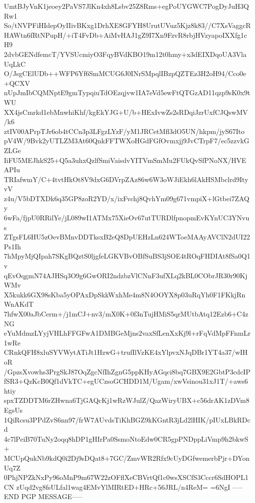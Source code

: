UmtBJyVnK1jeoey2PaVS7JlKn4xh8Lsbv25Z8Rms+egPoUYGWC7PogDyJuH3QRw1
So/tNVPFiHIdepOyIIivBKxg1DrhXE8GFYH8UrutUVuz5Kjz8k83//C7XsVaggcR
HAWtn6fRtNPupH/+iT4FvDb+AiMvHAJ1gZ9I7Xn9FzvR8rbjHVzyapoIXXfg1cH9
2dvbGENdfemcT/YVSUcmiyO3FqyBVdKBO19m12t0hmy+x3dEIXDqoUA3VlaUqLkC
O/JsgCElUDb++WFP6Yf6SmMCUG6J0INrSMpqlIBzpQZTEz3H2oH94/Cco0e+QCXV
nUpJmIbCQMNptE9gmTypqiuTdOEzqjvw1IA7eVd5ewFtQTGzAD11qzp9sK0x9tWU
XX4jsCmrkd1ebMnwhiKhf/kgEkYJG+U/b+HExIvwZs2sRDqiJzrUxfCJQswMV/k6
ztIV00APrpTJr6ob4tCCn3p3LFgzLYzF/yM1JRCetMfl3dO5UN/hkpm/jyS67Ito
pV4W/9Bvk2yUTLZM3At60QnkFFTWXoHGdFGfOvmxjj9JvCTrpF7/ec5zzvkGZLGe
IiFU5MEJhkS25+Q5a3uhxQzlfSmiVaisdvYITVmSmMu2FUkQvSfPNoNX/HVEAPIu
TRIafwmY/C+4tvtHkOt8V9dxG6DVrpZAz86w6W3oWJiEkh6lAkHSMbclrd9ItyvV
z4u/V5bDTXDk6q35GP8zoR2YD/x/ixFvchj8QvhYm09g671vmpiX+lGtbei7ZAQy
6wFa/fjpU0RRilYe/jL089wI1ATMx75XieOv67utTURDlfpnopmEvKYnUC3YNvus
ZTgsFL6HU5zOevBMnvDDTksxB2eQ8DpUEHzLn624WToeMAAyAVClN2dUI22Ps1Ih
7hMpyMjQIpah7SKgBQztS0ljgfeLGKVBvOBfSuBS3jSOE4tROqFHDIAt8fSa0Q1v
qEvOqgmN74AJHSq3O9g6GwORI2ndzbzVlCNnF3ufXLq2kBL0CObrJR30r90KjWMv
X5kukk6GX98sKba5yOPAxDpSkkWxhMe4m8N4OOYX8p03uRqYh0F1FKkjRnWnAKdT
7hfwX00aJbCerm+/j1mCJ+nv3/mX0K+0f3nTujHMiS5qrMUtbAtq12Ezb6+C4zNG
eYuMdmzLYyjVHLhFFGFwA1DMBGeMjns2vaxSfLenXxKj9l+rFqVdMpFFnmLr1wRe
CRnkQFH8xluSYVWytATiJt1HzwG+trufIlVzKE4xYlpvxNJqDBr1YT4a37/wIHoR
/GpzsXvowhs3PrgSkJ87OqZgcNfIhZgnG5ppKHyAGqci8bq7GBX9E2GbtP3cdcIP
fSR3+QzKcB0Qf1dVkTC+egUCzsoGCHDD1M/Ugam/xwVsinou31xJ1T/+aws6htiy
spxTZDDTM6rZHwna6TjGAQcKj1wRzWJulZ/QazWiryUBX+c56drAK1zDVm8EgsUs
1QiRcsu3PPdZvS6nn97/frW7AUvdsTiKhBGZ9kKGntR3jLd2lHIK/pIUxLBkRDcd
4c7lPeiB70TuNy2oqq8hDP1gHIrPa0SsmoNtoEdw0CR5gpPNDppLiVmp9h2bkwS+
MCUpQukNb9kdQ0i2Dj9sDQat8+7GC/ZmvWR2Rfx9cUyDGfwemerbPjr+DYonUq7Z
0PhjNPZkNxPy96oMnP9m67W22zOFflXeCBVrtQf1c0wsXSCfS3Cccr6SdHOPL1CN
zUqd2vg8fsULfal1wag4EMvYlMIRtED+HRc+56JRL/n4ReM=
=6NgI
-----END PGP MESSAGE-----
